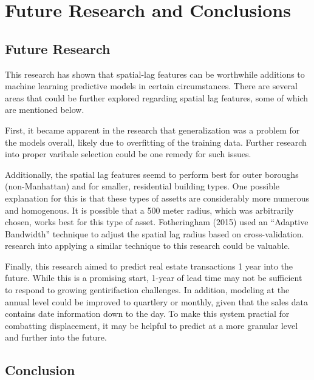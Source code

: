 \documentclass[12pt,]{article}
\begin{document}
\hypertarget{future-research-and-conclusions}{%
\section{Future Research and
Conclusions}\label{future-research-and-conclusions}}

\hypertarget{future-research}{%
\subsection{Future Research}\label{future-research}}

This research has shown that spatial-lag features can be worthwhile
additions to machine learning predictive models in certain
circumstances. There are several areas that could be further explored
regarding spatial lag features, some of which are mentioned below.

First, it became apparent in the research that generalization was a
problem for the models overall, likely due to overfitting of the
training data. Further research into proper varibale selection could be
one remedy for such issues.

Additionally, the spatial lag features seemd to perform best for outer
boroughs (non-Manhattan) and for smaller, residential building types.
One possible explanation for this is that these types of assetts are
considerably more numerous and homogenous. It is possible that a 500
meter radius, which was arbitrarily chosen, works best for this type of
asset. Fotheringham (2015) used an ``Adaptive Bandwidth'' technique to
adjust the spatial lag radius based on cross-validation. research into
applying a similar technique to this research could be valuable.

Finally, this research aimed to predict real estate transactions 1 year
into the future. While this is a promising start, 1-year of lead time
may not be sufficient to respond to growing gentirifaction challenges.
In addition, modeling at the annual level could be improved to quartlery
or monthly, given that the sales data contains date information down to
the day. To make this system practial for combatting displacement, it
may be helpful to predict at a more granular level and further into the
future.

\hypertarget{conclusion}{%
\subsection{Conclusion}\label{conclusion}}
\end{document}
